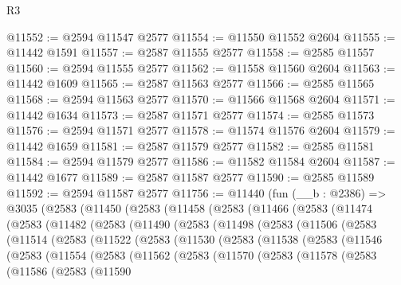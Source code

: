 \begin{lexlean}{R3}
\begin{coremodule}
@11552 := @2594 @11547 @2577
@11554 := @11550 @11552 @2604
@11555 := @11442 @1591
@11557 := @2587 @11555 @2577
@11558 := @2585 @11557
@11560 := @2594 @11555 @2577
@11562 := @11558 @11560 @2604
@11563 := @11442 @1609
@11565 := @2587 @11563 @2577
@11566 := @2585 @11565
@11568 := @2594 @11563 @2577
@11570 := @11566 @11568 @2604
@11571 := @11442 @1634
@11573 := @2587 @11571 @2577
@11574 := @2585 @11573
@11576 := @2594 @11571 @2577
@11578 := @11574 @11576 @2604
@11579 := @11442 @1659
@11581 := @2587 @11579 @2577
@11582 := @2585 @11581
@11584 := @2594 @11579 @2577
@11586 := @11582 @11584 @2604
@11587 := @11442 @1677
@11589 := @2587 @11587 @2577
@11590 := @2585 @11589
@11592 := @2594 @11587 @2577
@11756 := @11440
    (fun (__b : @2386) =>
    @3035
      (@2583
        (@11450
          (@2583
            (@11458
              (@2583
                (@11466
                  (@2583
                    (@11474
                      (@2583
                        (@11482
                          (@2583
                            (@11490
                              (@2583
                                (@11498
                                  (@2583
                                    (@11506
                                      (@2583
                                        (@11514
                                          (@2583
                                            (@11522
                                              (@2583
                                                (@11530
                                                  (@2583
                                                    (@11538
                                                      (@2583
                                                        (@11546
                                                          (@2583
                                                            (@11554
                                                              (@2583
                                                                (@11562
                                                                  (@2583
                                                                    (@11570
                                                                      (@2583
                                                                        (@11578
                                                                          (@2583
                                                                            (@11586
                                                                              (@2583
                                                                                (@11590

\end{coremodule}
\end{lexlean}
